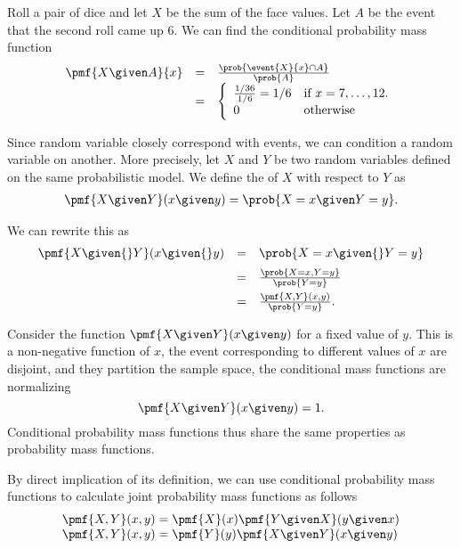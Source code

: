 {\begin{example}
Roll a pair of dice and let $X$ be the sum of the face values.  Let
$A$ be the event that the second roll came up $6$.
%
We can find the conditional probability mass function 
\[
\begin{array}{lll}
\pmf{X \given A}{x} & = & \frac{\prob{\event{X}{x} \cap A}}{\prob{A}}
\\
& = & 
\left\{
\begin{array}{ll}
\frac{1/36}{1/6} = 1/6 & \mbox{if}~x = 7,  \ldots, 12.
\\
0 & \mbox{otherwise}
\end{array}
\right.
\end{array}
\]
 
\end{example}

Since random variable closely correspond with events, we can
condition a random variable on another.
%
More precisely, let $X$ and $Y$ be two random variables defined on the
same probabilistic model.
%
We define the  of $X$ with
respect to $Y$ as 
\[
\begin{array}{l}
\pmf{X \given Y}(x \given y) = \prob{X = x \given Y = y}.
\end{array}
\] 

We can rewrite this as 
\[
\begin{array}{lll}
\pmf{X \given{} Y}(x \given{} y) 
& = & \prob{X = x \given{} Y = y}
\\[2mm]
& = & \frac{\prob{X = x, Y = y}}{\prob{Y = y}}
\\[2mm]
& = & \frac{\pmf{X,Y}(x,y)}{\prob{Y = y}}.
\end{array}
\] 

Consider the function $\pmf{X \given Y}(x \given y)$ for a fixed value
of $y$.  This is a non-negative function of $x$, the event
corresponding to different values of $x$ are disjoint, and they
partition the sample space, the conditional mass functions are
normalizing
\[
\pmf{X \given Y}(x \given y) = 1. 
\]
Conditional probability mass functions thus share the same properties
as probability mass functions.

By direct implication of its definition, we can use conditional
probability mass functions to calculate joint probability mass
functions as follows
\[
\begin{array}{lll}
\pmf{X,Y}(x,y) = \pmf{X}(x) \pmf{Y \given X}(y \given x)
\\
\pmf{X,Y}(x,y) = \pmf{Y}(y) \pmf{X \given Y}(x \given y)
\end{array}
\]
%

}
